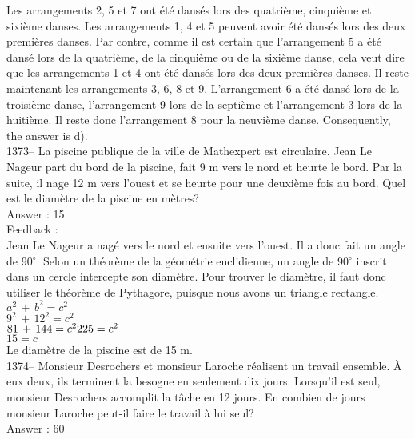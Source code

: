 ﻿\documentclass[letterpaper, 12pt]{article}
\begin{document}
Les arrangements 2, 5 et 7 ont \'et\'e dans\'es lors des quatri\`eme,
cinqui\`eme et sixi\`eme danses.  Les arrangements 1, 4 et 5 peuvent avoir
\'et\'e dans\'es lors des deux premi\`eres danses.  Par contre, comme il est
certain que l'arrangement 5 a \'et\'e dans\'e lors de la quatri\`eme, de la
cinqui\`eme ou de la sixi\`eme danse, cela veut dire que les arrangements 1
et 4 ont \'et\'e dans\'es lors des deux premi\`eres danses.  Il reste
maintenant les arrangements 3, 6, 8 et 9.  L'arrangement 6 a \'et\'e dans\'e
lors de la troisi\`eme danse, l'arrangement 9 lors de la septi\`eme et
l'arrangement 3 lors de la huiti\`eme.  Il reste donc l'arrangement 8 pour
la neuvi\`eme danse.  Consequently, the answer is d).\\

1373-- La piscine publique de la ville de Mathexpert est circulaire.
Jean Le Nageur part du bord de la piscine, fait 9 m vers le nord et
heurte le bord.  Par la suite, il nage 12 m vers l'ouest
et se heurte pour une deuxi\`eme fois au bord.  Quel est le diam\`etre de la
piscine en m\`etres?\\

Answer : 15\\

Feedback : \\
Jean Le Nageur a nag\'e vers le nord et ensuite vers l'ouest.  Il a donc
fait un angle de 90$^{\circ}$.  Selon un th\'eor\`eme de la g\'eom\'etrie
euclidienne, un angle de 90$^{\circ}$ inscrit dans un cercle intercepte son
diam\`etre.  Pour trouver le diam\`etre, il faut donc utiliser le
th\'eor\`eme de Pythagore, puisque nous avons un triangle rectangle.  \\
$a^{2}\,+\,b^{2}=c^{2}$\\
$9^{2}\,+\,12^{2}=c^{2}$\\
$81\,+\,144=c^{2}\\
225=c^{2}$\\
$15=c$\\
Le diam\`etre de la piscine est de 15 m.\\

1374-- Monsieur Desrochers et monsieur Laroche r\'ealisent un travail
ensemble.  \`A eux deux, ils terminent la besogne en seulement dix jours.
Lorsqu'il est seul, monsieur Desrochers accomplit la t\^ache en 12 jours.
En combien de jours monsieur Laroche peut-il faire le travail \`a lui
seul?\\

Answer : 60\\
\end{document}
